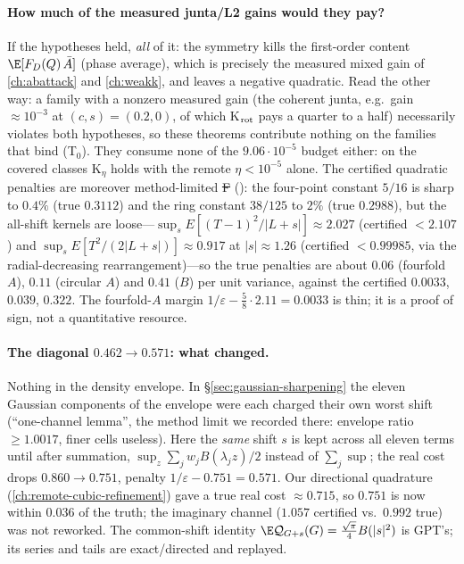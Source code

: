\paragraph{How much of the measured junta/L2 gains would they pay?} If the hypotheses held, \emph{all} of it: the symmetry kills the first-order content $\E[F_D(Q)\,\bar A]$ (phase average), which is
precisely the measured mixed gain of \autoref{ch:abattack} and \autoref{ch:weakk}, and leaves a negative quadratic. Read the other way: a family with a nonzero measured gain (the coherent junta, e.g.\ gain
$\approx10^{-3}$ at $(c,s)=(0.2,0)$, of which K$_{\rm rot}$ pays a quarter to a half) necessarily violates both hypotheses, so these theorems contribute nothing on the families that bind (T$_0$). They
consume none of the $9.06\cdot10^{-5}$ budget either: on the covered classes K$_\eta$ holds with the remote $\eta<10^{-5}$ alone. The certified quadratic penalties are moreover method-limited \st{F}
(): the four-point constant $5/16$ is sharp to $0.4\%$ (true $0.3112$) and the ring constant $38/125$ to $2\%$ (true $0.2988$), but the all-shift kernels are
loose---$\sup_sE[(T-1)^2/|L+s|]\approx2.027$ (certified $<2.107$) and $\sup_sE[T^2/(2|L+s|)]\approx0.917$ at $|s|\approx1.26$ (certified $<0.99985$, via the radial-decreasing rearrangement)---so the true
penalties are about $0.06$ (fourfold $A$), $0.11$ (circular $A$) and $0.41$ ($B$) per unit variance, against the certified $0.0033$, $0.039$, $0.322$. The fourfold-$A$ margin
$1/\varepsilon-\tfrac58\cdot2.11=0.0033$ is thin; it is a proof of sign, not a quantitative resource.

\paragraph{The diagonal $0.462\to0.571$: what changed.} Nothing in the density envelope. In \S\ref{sec:gaussian-sharpening} the eleven Gaussian components of the envelope were each charged their own
worst shift (``one-channel lemma'', the method limit we recorded there: envelope ratio $\ge1.0017$, finer cells useless). Here the \emph{same} shift $s$ is kept across all eleven terms until after
summation, $\sup_z\sum_jw_jB(\lambda_jz)/2$ instead of $\sum_j\sup$; the real cost drops $0.860\to0.751$, penalty $1/\varepsilon-0.751=0.571$. Our directional quadrature (\autoref{ch:remote-cubic-refinement})
gave a true real cost $\approx0.715$, so $0.751$ is now within $0.036$ of the truth; the imaginary channel ($1.057$ certified vs.\ $0.992$ true) was not reworked. The common-shift identity
$\E\mathcal Q_{G+s}(G)=\frac{\sqrt\pi}4B(|s|^2)$ is GPT's; its series and tails are exact/directed and replayed.

